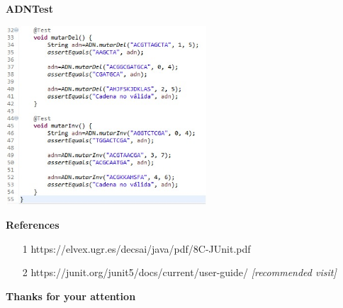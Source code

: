 \documentclass[11pt]{beamer}
\begin{document}

\begin{frame}{\textbf{ADNTest}}

\begin{center}
\includegraphics[width=7.5cm]{img/Prueba4.2.jpeg}
\end{center}

\end{frame}


\begin{frame}{\textbf{References}}

\begin{itemize}
\item[1] https://elvex.ugr.es/decsai/java/pdf/8C-JUnit.pdf
\item[2] https://junit.org/junit5/docs/current/user-guide/ \textit{[recommended visit]}
\end{itemize}

\end{frame}


\begin{frame}

\begin{center}
\textbf{\Huge Thanks for your attention}
\end{center}

\end{frame}
\end{document}
